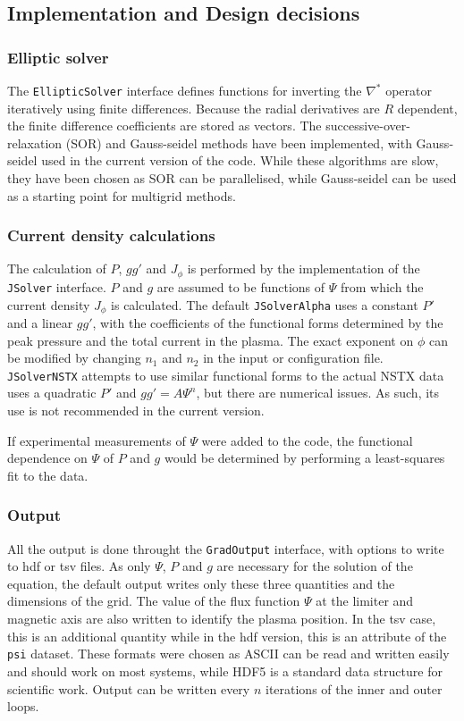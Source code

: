 \documentclass[paper=letter, fontsize=11pt]{scrartcl} %
\begin{document}
\subsection{Implementation and Design decisions}

\subsubsection{Elliptic solver}
The \texttt{EllipticSolver} interface defines functions for inverting the $\nabla^*$ operator iteratively using finite differences. Because the radial derivatives are $R$ dependent, the finite difference coefficients are stored as vectors. The successive-over-relaxation (SOR) and Gauss-seidel methods have been implemented, with Gauss-seidel used in the current version of the code. While these algorithms are slow, they have been chosen as SOR can be parallelised, while Gauss-seidel can be used as a starting point for multigrid methods. 

\subsubsection{Current density calculations}
The calculation of $P$, $gg'$ and $J_\phi$ is performed by the implementation of the \texttt{JSolver} interface. $P$ and $g$ are assumed to be functions of $\Psi$ from which the current density $J_\phi$ is calculated. The default \texttt{JSolverAlpha} uses a constant $P'$ and a linear $gg'$, with the coefficients of the functional forms determined by the peak pressure and the total current in the plasma. The exact exponent on $\phi$ can be modified by changing $n_1$ and $n_2$ in the input or configuration file. \texttt{JSolverNSTX} attempts to use similar functional forms to the actual NSTX data uses a quadratic $P'$ and $gg' = A\Psi^n$, but there are numerical issues. As such, its use is not recommended in the current version. 

If experimental measurements of $\Psi$ were added to the code, the functional dependence on $\Psi$ of $P$ and $g$ would be determined by performing a least-squares fit to the data. 

\subsubsection{Output}
All the output is done throught the \texttt{GradOutput} interface, with options to write to hdf or tsv files. As only $\Psi$, $P$ and $g$ are necessary for the solution of the equation, the default output writes only these three quantities and the dimensions of the grid. The value of the flux function $\Psi$ at the limiter and magnetic axis are also written to identify the plasma position. In the tsv case, this is an additional quantity while in the hdf version, this is an attribute of the \texttt{psi} dataset. These formats were chosen as ASCII can be read and written easily and should work on most systems, while HDF5 is a standard data structure for scientific work. Output can be written every $n$ iterations of the inner and outer loops. 
\end{document}
